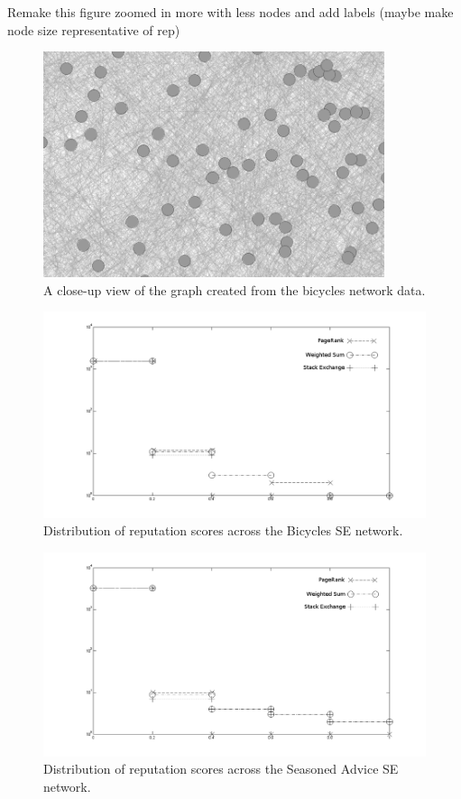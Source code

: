 \documentclass[]{final_report}
\begin{document}

Remake this figure zoomed in more with less nodes and add labels (maybe make node size representative of rep)
\begin{figure}[ht!]
\centering
\includegraphics[width=100mm]{chap4/gephigraph.PNG}
\caption{A close-up view of the graph created from the bicycles network data.}
\end{figure}\label{gra:network}

\begin{figure}[ht!]
\centering
\includegraphics[width=120mm]{chap3/bicycles_hist.png}
\caption{Distribution of reputation scores across the Bicycles SE network.}\label{fig:histogram}
\end{figure}\label{gra:bicyclehist}

\begin{figure}[ht!]
\centering
\includegraphics[width=120mm]{chap3/cooking_hist.png}
\caption{Distribution of reputation scores across the Seasoned Advice SE network.}
\end{figure}\label{gra:cookinghist}
\end{document}
